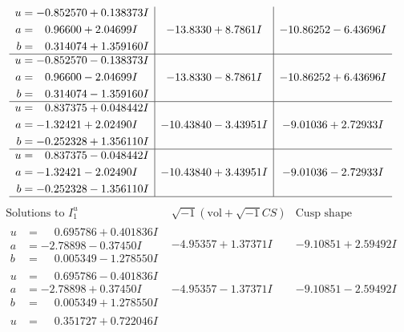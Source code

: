 \documentclass[1p]{elsarticle_modified}
\theoremstyle{definition}
\newcommand{\I}{\sqrt{-1}}
\begin{document}
$$\begin{array}{c|c|c}
\begin{aligned}
u &= -0.852570 + 0.138373 I \\
a &= \phantom{-}0.96600 + 2.04699 I \\
b &= \phantom{-}0.314074 + 1.359160 I\end{aligned}
 & -13.8330 + 8.7861 I & -10.86252 - 6.43696 I \\ \hline\begin{aligned}
u &= -0.852570 - 0.138373 I \\
a &= \phantom{-}0.96600 - 2.04699 I \\
b &= \phantom{-}0.314074 - 1.359160 I\end{aligned}
 & -13.8330 - 8.7861 I & -10.86252 + 6.43696 I \\ \hline\begin{aligned}
u &= \phantom{-}0.837375 + 0.048442 I \\
a &= -1.32421 + 2.02490 I \\
b &= -0.252328 + 1.356110 I\end{aligned}
 & -10.43840 - 3.43951 I & -9.01036 + 2.72933 I \\ \hline\begin{aligned}
u &= \phantom{-}0.837375 - 0.048442 I \\
a &= -1.32421 - 2.02490 I \\
b &= -0.252328 - 1.356110 I\end{aligned}
 & -10.43840 + 3.43951 I & -9.01036 - 2.72933 I\\
 \hline 
 \end{array}$$\newpage$$\begin{array}{c|c|c}  
\text{Solutions to }I^u_{1}& \I (\text{vol} + \sqrt{-1}CS) & \text{Cusp shape}\\
 \hline 
\begin{aligned}
u &= \phantom{-}0.695786 + 0.401836 I \\
a &= -2.78898 - 0.37450 I \\
b &= \phantom{-}0.005349 - 1.278550 I\end{aligned}
 & -4.95357 + 1.37371 I & -9.10851 + 2.59492 I \\ \hline\begin{aligned}
u &= \phantom{-}0.695786 - 0.401836 I \\
a &= -2.78898 + 0.37450 I \\
b &= \phantom{-}0.005349 + 1.278550 I\end{aligned}
 & -4.95357 - 1.37371 I & -9.10851 - 2.59492 I \\ \hline\begin{aligned}
u &= \phantom{-}0.351727 + 0.722046 I \\

\end{aligned}
\end{array}$$
\end{document}
